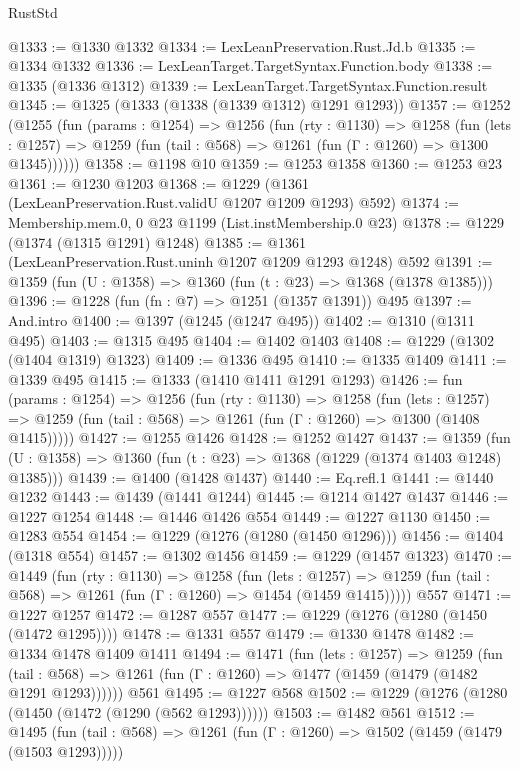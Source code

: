 \begin{lexlean}{RustStd}
\begin{coremodule}
@1333 := @1330 @1332
@1334 := LexLeanPreservation.Rust.Jd.b
@1335 := @1334 @1332
@1336 := LexLeanTarget.TargetSyntax.Function.body
@1338 := @1335 (@1336 @1312)
@1339 := LexLeanTarget.TargetSyntax.Function.result
@1345 := @1325 (@1333 (@1338 (@1339 @1312) @1291 @1293))
@1357 := @1252
    (@1255
      (fun (params : @1254) =>
      @1256
        (fun (rty : @1130) =>
        @1258
          (fun (lets : @1257) =>
          @1259 (fun (tail : @568) => @1261 (fun (Γ : @1260) => @1300 @1345))))))
@1358 := @1198 @10
@1359 := @1253 @1358
@1360 := @1253 @23
@1361 := @1230 @1203
@1368 := @1229 (@1361 (LexLeanPreservation.Rust.validU @1207 @1209 @1293) @592)
@1374 := Membership.mem.{0, 0} @23 @1199 (List.instMembership.{0} @23)
@1378 := @1229 (@1374 (@1315 @1291) @1248)
@1385 := @1361 (LexLeanPreservation.Rust.uninh @1207 @1209 @1293 @1248) @592
@1391 := @1359 (fun (U : @1358) => @1360 (fun (t : @23) => @1368 (@1378 @1385)))
@1396 := @1228 (fun (fn : @7) => @1251 (@1357 @1391)) @495
@1397 := And.intro
@1400 := @1397 (@1245 (@1247 @495))
@1402 := @1310 (@1311 @495)
@1403 := @1315 @495
@1404 := @1402 @1403
@1408 := @1229 (@1302 (@1404 @1319) @1323)
@1409 := @1336 @495
@1410 := @1335 @1409
@1411 := @1339 @495
@1415 := @1333 (@1410 @1411 @1291 @1293)
@1426 := fun (params : @1254) =>
  @1256
    (fun (rty : @1130) =>
    @1258
      (fun (lets : @1257) =>
      @1259 (fun (tail : @568) => @1261 (fun (Γ : @1260) => @1300 (@1408 @1415)))))
@1427 := @1255 @1426
@1428 := @1252 @1427
@1437 := @1359 (fun (U : @1358) => @1360 (fun (t : @23) => @1368 (@1229 (@1374 @1403 @1248) @1385)))
@1439 := @1400 (@1428 @1437)
@1440 := Eq.refl.{1}
@1441 := @1440 @1232
@1443 := @1439 (@1441 @1244)
@1445 := @1214 @1427 @1437
@1446 := @1227 @1254
@1448 := @1446 @1426 @554
@1449 := @1227 @1130
@1450 := @1283 @554
@1454 := @1229 (@1276 (@1280 (@1450 @1296)))
@1456 := @1404 (@1318 @554)
@1457 := @1302 @1456
@1459 := @1229 (@1457 @1323)
@1470 := @1449
    (fun (rty : @1130) =>
    @1258
      (fun (lets : @1257) =>
      @1259 (fun (tail : @568) => @1261 (fun (Γ : @1260) => @1454 (@1459 @1415)))))
    @557
@1471 := @1227 @1257
@1472 := @1287 @557
@1477 := @1229 (@1276 (@1280 (@1450 (@1472 @1295))))
@1478 := @1331 @557
@1479 := @1330 @1478
@1482 := @1334 @1478 @1409 @1411
@1494 := @1471
    (fun (lets : @1257) =>
    @1259
      (fun (tail : @568) => @1261 (fun (Γ : @1260) => @1477 (@1459 (@1479 (@1482 @1291 @1293))))))
    @561
@1495 := @1227 @568
@1502 := @1229 (@1276 (@1280 (@1450 (@1472 (@1290 (@562 @1293))))))
@1503 := @1482 @561
@1512 := @1495
    (fun (tail : @568) => @1261 (fun (Γ : @1260) => @1502 (@1459 (@1479 (@1503 @1293)))))

\end{coremodule}
\end{lexlean}
